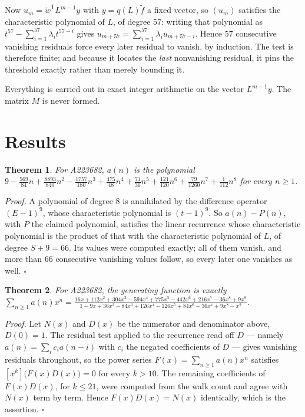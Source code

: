 \documentclass[11pt]{article}
\newtheorem{theorem}{Theorem}
\theoremstyle{definition}
\begin{document}
Now $u_m = \tilde w^{\mathsf T} L^{m-1} y$ with $y = q(L)\tilde f$ a fixed vector, so $(u_m)$ satisfies the characteristic polynomial of $L$, of degree $57$: writing that polynomial as $t^{57} - \sum_{i=1}^{57} \lambda_i t^{57-i}$ gives $u_{m+57} = \sum_{i=1}^{57} \lambda_i u_{m+57-i}$. Hence $57$ consecutive vanishing residuals force every later residual to vanish, by induction. The test is therefore finite; and because it locates the {\itshape last} nonvanishing residual, it pins the threshold exactly rather than merely bounding it.

Everything is carried out in exact integer arithmetic on the vector $L^{m-1}y$. The matrix $M$ is never formed.

\section{Results}

\begin{theorem} For A223682, $a(n)$ is the polynomial $9 - \frac{569}{84}n + \frac{8893}{840}n^{2} - \frac{1757}{180}n^{3} + \frac{475}{48}n^{4} + \frac{71}{36}n^{5} + \frac{121}{120}n^{6} + \frac{79}{1260}n^{7} + \frac{1}{112}n^{8}$ for every $n \ge 1$.\end{theorem}

{\itshape Proof.} A polynomial of degree $8$ is annihilated by the difference operator $(E-1)^{9}$, whose characteristic polynomial is $(t-1)^{9}$. So $a(n) - P(n)$, with $P$ the claimed polynomial, satisfies the linear recurrence whose characteristic polynomial is the product of that with the characteristic polynomial of $L$, of degree $S + 9 = 66$. Its values were computed exactly; all of them vanish, and more than $66$ consecutive vanishing values follow, so every later one vanishes as well. $\square$

\begin{theorem} For A223682, the generating function is exactly $\sum_{n\ge 1} a(n)x^n = \frac{16x + 112x^{2} + 304x^{3} - 594x^{4} + 775x^{5} - 442x^{6} + 216x^{7} - 36x^{8} + 9x^{9}}{1 - 9x + 36x^{2} - 84x^{3} + 126x^{4} - 126x^{5} + 84x^{6} - 36x^{7} + 9x^{8} - x^{9}}$.\end{theorem}

{\itshape Proof.} Let $N(x)$ and $D(x)$ be the numerator and denominator above, $D(0)=1$. The residual test applied to the recurrence read off $D$ --- namely $a(n) = \sum_i c_i a(n-i)$ with $c_i$ the negated coefficients of $D$ --- gives vanishing residuals throughout, so the power series $F(x)=\sum_{n\ge 1}a(n)x^n$ satisfies $[x^k]\bigl(F(x)D(x)\bigr) = 0$ for every $k > 10$. The remaining coefficients of $F(x)D(x)$, for $k \le 21$, were computed from the walk count and agree with $N(x)$ term by term. Hence $F(x)D(x) = N(x)$ identically, which is the assertion. $\square$
\end{document}
